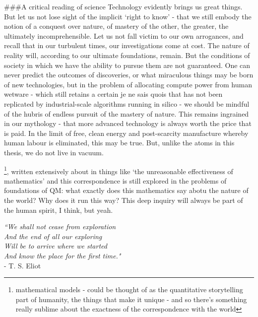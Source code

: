 \#\#\#A critical reading of science Technology evidently brings us great
things.
	But let us not lose sight of the implicit `right to know' - that
we still embody the notion of a conquest over nature, of mastery of the
other, the greater, the ultimately incomprehensible.
	Let us not fall
victim to our own arrogances, and recall that in our turbulent times,
our investigations come at cost.
	The nature of reality will, according
to our ultimate foundations, remain.
	But the conditions of society in
which we have the ability to pursue them are not guaranteed.
	One can
never predict the outcomes of discoveries, or what miraculous things may
be born of new technologies, but in the problem of allocating compute
power from human wetware - which still retains a certain je ne sais
quois that has not been replicated by industrial-scale algorithms
running in silico - we should be mindful of the hubris of endless
pursuit of the mastery of nature.
	This remains ingrained in our
mythology - that more advanced technology is always worth the price that
is paid.
	In the limit of free, clean energy and post-scarcity
manufacture whereby human labour is eliminated, this may be true.
	But,
unlike the atoms in this thesis, we do not live in vacuum.


\footnote{mathematical models - could be thought of as the quantitative storytelling part of humanity, the things that make it unique - and so there's something really sublime about the exactness of the correspondence with the world}, written extensively about in things like `the unreasonable effectiveness of mathematics' and this correspondence is still explored in the problems of foundations of QM: what exactly does this mathematics say abotu the nature of the world? Why does it run this way? This deep inquiry will always be part of the human spirit, I think, but yeah.
	

\vfill
\begin{flushright}
\emph{``We shall not cease from exploration\\
And the end of all our exploring \\
Will be to arrive where we started \\
And know the place for the first time."\\} 
- T.
	S.
	Eliot
\end{flushright}

